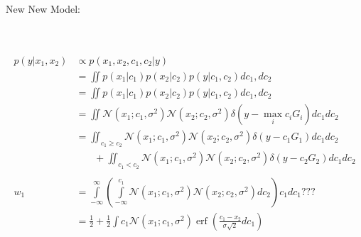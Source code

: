 \documentclass[12pt]{article}
\DeclareMathOperator*{\erf}{erf}
\begin{document}
\\
\\
New New Model:
\\
\\
\\
\begin{equation}
\begin{aligned}
p(y|x_1, x_2) & \propto p(x_1, x_2, c_1, c_2 | y)\\
& = \iint p(x_1|c_1) p(x_2|c_2) p(y | c_1, c_2) d c_1, d c_2 \\
& = \iint p(x_1|c_1) p(x_2|c_2) p(y | c_1, c_2) d c_1, d c_2 \\
& = \iint \mathcal{N}(x_1; c_1, \sigma^2) \mathcal{N}(x_2; c_2, \sigma^2) \delta(y - \max_i c_iG_i) dc_1 dc_2 \\
& = \iint_{c_1 \geq c_2} \mathcal{N}(x_1; c_1, \sigma^2) \mathcal{N}(x_2; c_2, \sigma^2) \delta(y - c_1G_1) dc_1 dc_2 \\
& \phantom{{}=1} + \iint_{c_1 < c_2} \mathcal{N}(x_1; c_1, \sigma^2) \mathcal{N}(x_2; c_2, \sigma^2) \delta(y - c_2G_2) dc_1 dc_2\\
\\
w_1 & = \int\limits_{-\infty}^{\infty}(\int\limits_{-\infty}^{c_1} \mathcal{N}(x_1; c_1, \sigma^2) \mathcal{N}(x_2; c_2, \sigma^2) dc_2) c_1 dc_1 ???\\
& = \frac{1}{2} + \frac{1}{2}\int c_1 \mathcal{N}(x_1; c_1, \sigma^2) \erf (\frac{c_1 - x_2}{\sigma \sqrt{2}} d c_1)
\end{aligned}
\end{equation}
\end{document}
